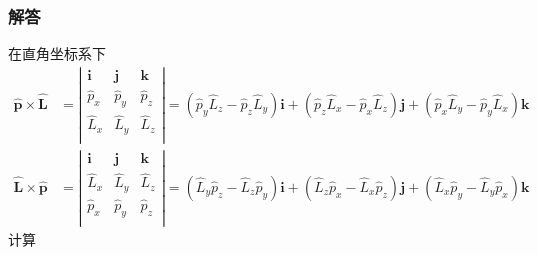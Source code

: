 \subsubsection{解答}
在直角坐标系下
\begin{equation}
    \begin{aligned}
        \hat{\boldsymbol{p}}\times \hat{\boldsymbol{L}}&=\left| \begin{matrix}
	\boldsymbol{i}&		\boldsymbol{j}&		\boldsymbol{k}\\
	\hat{p}_x&		\hat{p}_y&		\hat{p}_z\\
	\hat{L}_x&		\hat{L}_y&		\hat{L}_z\\
\end{matrix} \right|=\left( \hat{p}_y\hat{L}_z-\hat{p}_z\hat{L}_y \right) \boldsymbol{i}+\left( \hat{p}_z\hat{L}_x-\hat{p}_x\hat{L}_z \right) \boldsymbol{j}+\left( \hat{p}_x\hat{L}_y-\hat{p}_y\hat{L}_x \right) \boldsymbol{k}
\\
\hat{\boldsymbol{L}}\times \hat{\boldsymbol{p}}&=\left| \begin{matrix}
	\boldsymbol{i}&		\boldsymbol{j}&		\boldsymbol{k}\\
	\hat{L}_x&		\hat{L}_y&		\hat{L}_z\\
	\hat{p}_x&		\hat{p}_y&		\hat{p}_z\\
\end{matrix} \right|=\left( \hat{L}_y\hat{p}_z-\hat{L}_z\hat{p}_y \right) \boldsymbol{i}+\left( \hat{L}_z\hat{p}_x-\hat{L}_x\hat{p}_z \right) \boldsymbol{j}+\left( \hat{L}_x\hat{p}_y-\hat{L}_y\hat{p}_x \right) \boldsymbol{k}
    \end{aligned}
\end{equation}
计算
